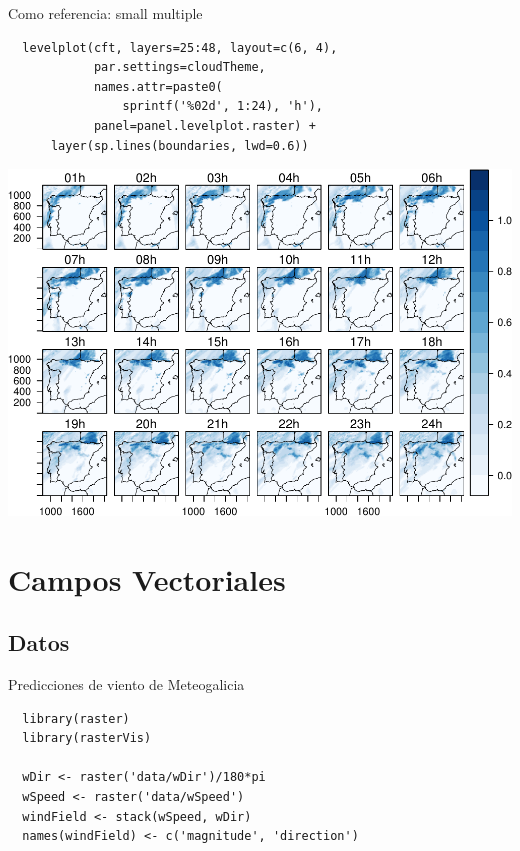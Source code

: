 \documentclass[xcolor={usenames,svgnames,dvipsnames}]{beamer}
\begin{document}
\begin{frame}[fragile,label=sec-4-5-5]{Como referencia: small multiple}
 \lstset{language=R,label= ,caption= ,numbers=none}
\begin{lstlisting}
  levelplot(cft, layers=25:48, layout=c(6, 4),
            par.settings=cloudTheme,
            names.attr=paste0(
                sprintf('%02d', 1:24), 'h'),
            panel=panel.levelplot.raster) +
      layer(sp.lines(boundaries, lwd=0.6))
\end{lstlisting}
\end{frame}

\begin{frame}[label=sec-4-5-6]{}
\includegraphics[width=.9\linewidth]{figs/cft.pdf}
\end{frame}


\section{Campos Vectoriales}
\label{sec-5}

\subsection{Datos}
\label{sec-5-1}

\begin{frame}[fragile,label=sec-5-1-1]{Predicciones de viento de Meteogalicia}
 \lstset{language=R,label= ,caption= ,numbers=none}
\begin{lstlisting}
  library(raster)
  library(rasterVis)
  
  wDir <- raster('data/wDir')/180*pi
  wSpeed <- raster('data/wSpeed')
  windField <- stack(wSpeed, wDir)
  names(windField) <- c('magnitude', 'direction')
\end{lstlisting}
\end{frame}
\end{document}
